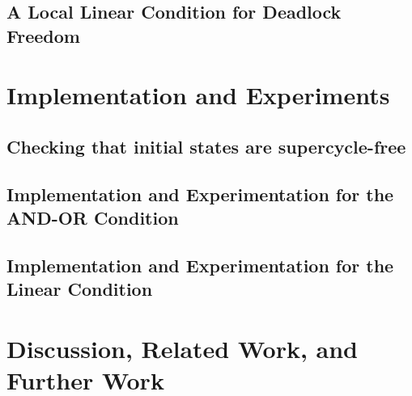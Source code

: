 \message{ !name(dfBIP.tex)}\documentclass[11pt]{article}
\begin{document}
   \subsection{A Local Linear Condition for Deadlock Freedom}
   \label{s:condition}
   


\section{Implementation and Experiments}
\label{s:impl}

   \subsection{Checking that initial states are supercycle-free}
   \label{s:initSCFree}
   

   \subsection{Implementation and Experimentation for the AND-OR Condition}
   \label{s:implANDOR}
   

   \clearpage
   \subsection{Implementation and Experimentation for the Linear Condition}
   \label{s:implLin}
   






\clearpage
\section{Discussion, Related Work, and Further Work}
\label{s:discussion}








%
%
\end{document}
